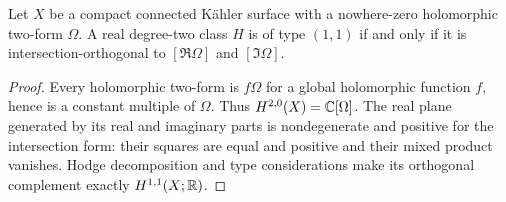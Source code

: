 \begin{lemma}\label{lem:endpoint-hodge-type}
Let $X$ be a compact connected K\"ahler surface with a nowhere-zero
holomorphic two-form $\Omega$. A real degree-two class $H$ is of type
$(1,1)$ if and only if it is intersection-orthogonal to
$[\Re\Omega]$ and $[\Im\Omega]$.
\end{lemma}

\begin{proof}
Every holomorphic two-form is $f\Omega$ for a global holomorphic
function $f$, hence is a constant multiple of $\Omega$. Thus
$H^{2,0}(X)=\mathbb C[\Omega]$. The real plane generated by its real and
imaginary parts is nondegenerate and positive for the intersection
form: their squares are equal and positive and their mixed product
vanishes. Hodge decomposition and type considerations make its
orthogonal complement exactly $H^{1,1}(X;\mathbb R)$.
\end{proof}



